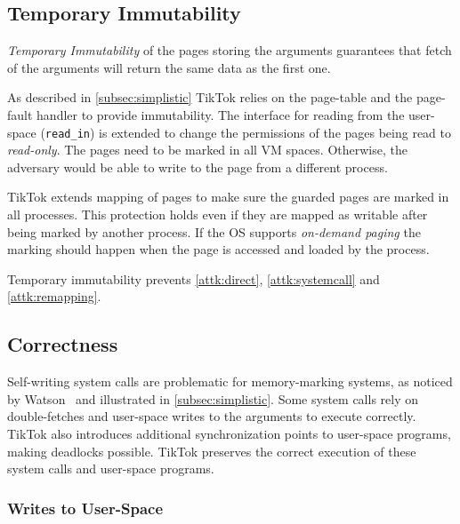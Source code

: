 \documentclass[conference]{IEEEtran}
\newcommand{\sysname}{TikTok}
\begin{document}
\subsection{Temporary Immutability}
\label{subsec:tempimmut}
\emph{Temporary Immutability} of the pages storing the arguments guarantees that
fetch of the arguments will return the same data as the first one.

As described in \autoref{subsec:simplistic} \sysname{} relies on the
page-table and the page-fault handler to provide immutability. The interface for
reading from the user-space (\texttt{read\_in}) is extended to change the
permissions of the pages being read to \emph{read-only}. The pages need to be
marked in all VM spaces. Otherwise, the adversary would be able to write to the
page from a different process.

\sysname{} extends mapping of pages to make sure the guarded pages are marked in
all processes. This protection holds even if they are mapped as writable after
being marked by another process. If the OS supports \emph{on-demand paging} the
marking should happen when the page is accessed and loaded by the process.

Temporary immutability prevents \autoref{attk:direct}, \autoref{attk:systemcall}
and \autoref{attk:remapping}.

\subsection{Correctness}
\label{subsec:correctness}
Self-writing system calls are problematic for memory-marking systems, as noticed
by Watson~\cite{watson2007exploiting} and illustrated in
\autoref{subsec:simplistic}. Some system calls rely on double-fetches and
user-space writes to the arguments to execute correctly. \sysname{} also
introduces additional synchronization points to user-space programs, making
deadlocks possible. \sysname{} preserves the correct execution of these system
calls and user-space programs.

\subsubsection{Writes to User-Space}
\end{document}
